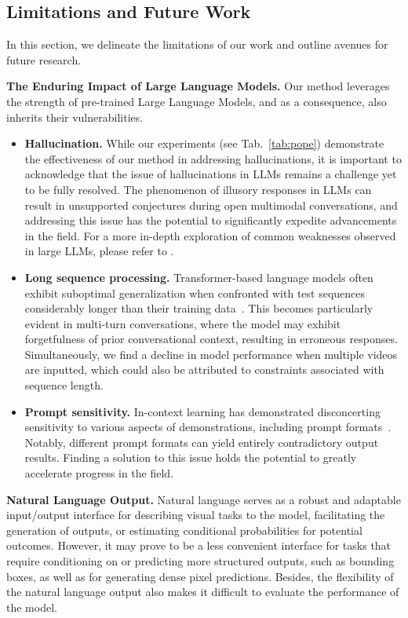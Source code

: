 \documentclass[10pt,twocolumn,letterpaper]{article}
\newcommand{\myparagraph}[1]{\textbf{#1}\hspace{1.8ex}}
\begin{document}
\subsection{Limitations and Future Work}
In this section, we delineate the limitations of our work and outline avenues for future research.

\noindent \myparagraph{The Enduring Impact of Large Language Models.}
Our method leverages the strength of pre-trained Large Language Models, and as a consequence, also inherits their vulnerabilities.

\begin{itemize}
    \item \textbf{Hallucination.} While our experiments (see Tab.~\ref{tab:pope}) demonstrate the effectiveness of our method in addressing hallucinations, it is important to acknowledge that the issue of hallucinations in LLMs remains a challenge yet to be fully resolved. The phenomenon of illusory responses in LLMs can result in unsupported conjectures during open multimodal conversations, and addressing this issue has the potential to significantly expedite advancements in the field. For a more in-depth exploration of common weaknesses observed in large LLMs, please refer to \citet{brown2020language,rae2021scaling}.
    
    \item \textbf{Long sequence processing.} Transformer-based language models often exhibit suboptimal generalization when confronted with test sequences considerably longer than their training data~\cite{press2021train}. This becomes particularly evident in multi-turn conversations, where the model may exhibit forgetfulness of prior conversational context, resulting in erroneous responses. Simultaneously, we find a decline in model performance when multiple videos are inputted, which could also be attributed to constraints associated with sequence length.
    
    \item \textbf{Prompt sensitivity.} In-context learning has demonstrated disconcerting sensitivity to various aspects of demonstrations, including prompt formats~\cite{zhao2021calibrate}. Notably, different prompt formats can yield entirely contradictory output results. Finding a solution to this issue holds the potential to greatly accelerate progress in the field.
    
\end{itemize}

\noindent \myparagraph{Natural Language Output.}
Natural language serves as a robust and adaptable input/output interface for describing visual tasks to the model, facilitating the generation of outputs, or estimating conditional probabilities for potential outcomes. However, it may prove to be a less convenient interface for tasks that require conditioning on or predicting more structured outputs, such as bounding boxes, as well as for generating dense pixel predictions. Besides, the flexibility of the natural language output also makes it difficult to evaluate the performance of the model.
\end{document}
